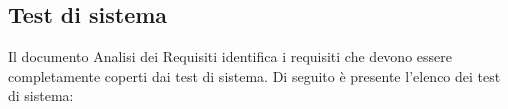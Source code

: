 \documentclass[10pt, a4paper]{article}
\begin{document}

\subsection{Test di sistema}
Il documento Analisi dei Requisiti identifica i requisiti che devono essere completamente coperti dai test di sistema. Di seguito è presente l'elenco dei test di sistema:
\end{document}
